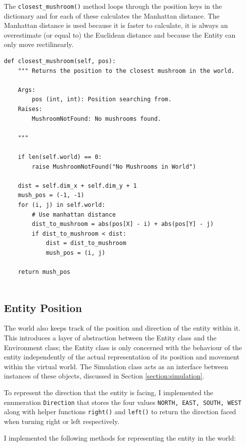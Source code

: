 \documentclass[12pt,a4paper,twoside,openright]{report}
\renewcommand{\baselinestretch}{1.1}    %
\begin{document}
The \texttt{closest\_mushroom()} method loops through the position keys in the dictionary and for each of these calculates the Manhattan distance. The Manhattan distance is used because it is faster to calculate, it is always an overestimate (or equal to) the Euclidean distance and because the Entity can only move rectilinearly. 

{\renewcommand{\baselinestretch}{0.8}\small
\begin{verbatim}
def closest_mushroom(self, pos):
    """ Returns the position to the closest mushroom in the world.
    
    Args:
        pos (int, int): Position searching from.
    Raises:
        MushroomNotFound: No mushrooms found.

    """

    if len(self.world) == 0:
        raise MushroomNotFound("No Mushrooms in World")
        
    dist = self.dim_x + self.dim_y + 1
    mush_pos = (-1, -1)
    for (i, j) in self.world:
        # Use manhattan distance
        dist_to_mushroom = abs(pos[X] - i) + abs(pos[Y] - j)
        if dist_to_mushroom < dist:
            dist = dist_to_mushroom
            mush_pos = (i, j)

    return mush_pos
	
\end{verbatim}
}

\subsection{Entity Position}

The world also keeps track of the position and direction of the entity within it. This introduces a layer of abstraction between the Entity class and the Environment class; the Entity class is only concerned with the behaviour of the entity independently of the actual representation of its position and movement within the virtual world. The Simulation class acts as an interface between instances of these objects, discussed in Section \ref{section:simulation}.

To represent the direction that the entity is facing, I implemented the enumeration \texttt{Direction} that stores the four values \texttt{NORTH, EAST, SOUTH, WEST} along with helper functions \texttt{right()} and \texttt{left()} to return the direction faced when turning right or left respectively.

I implemented the following methods for representing the entity in the world:
\end{document}
